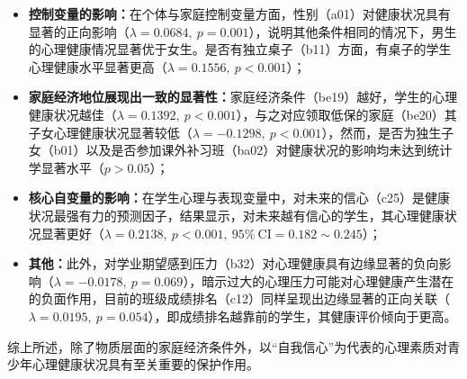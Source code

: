 \documentclass[zihao = -4, linespread = 1.5]{article}
\begin{document}
\begin{itemize}
    \item \textbf{控制变量的影响：}在个体与家庭控制变量方面，性别（a01）对健康状况具有显著的正向影响（$\lambda=0.0684,\ p=0.001$），说明其他条件相同的情况下，男生的心理健康情况显著优于女生。是否有独立桌子（b11）方面，有桌子的学生心理健康水平显著更高（$\lambda=0.1556,\ p<0.001$）；
    \item \textbf{家庭经济地位展现出一致的显著性：}家庭经济条件（be19）越好，学生的心理健康状况越佳（$\lambda=0.1392,\ p<0.001$），与之对应领取低保的家庭（be20）其子女心理健康状况显著较低（$\lambda=-0.1298,\ p<0.001$），然而，是否为独生子女（b01）以及是否参加课外补习班（ba02）对健康状况的影响均未达到统计学显著水平（$p>0.05$）；
    \item \textbf{核心自变量的影响：}在学生心理与表现变量中，对未来的信心（c25）是健康状况最强有力的预测因子，结果显示，对未来越有信心的学生，其心理健康状况显著更好（$\lambda=0.2138,\ p<0.001,\ 95\%\ \text{CI}=0.182\sim0.245$）；
    \item \textbf{其他：}此外，对学业期望感到压力（b32）对心理健康具有边缘显著的负向影响（$\lambda=-0.0178,\ p=0.069$），暗示过大的心理压力可能对心理健康产生潜在的负面作用，目前的班级成绩排名（c12）同样呈现出边缘显著的正向关联（$\lambda=0.0195,\ p=0.054$），即成绩排名越靠前的学生，其健康评价倾向于更高。
\end{itemize}

综上所述，除了物质层面的家庭经济条件外，以“自我信心”为代表的心理素质对青少年心理健康状况具有至关重要的保护作用。
\end{document}
